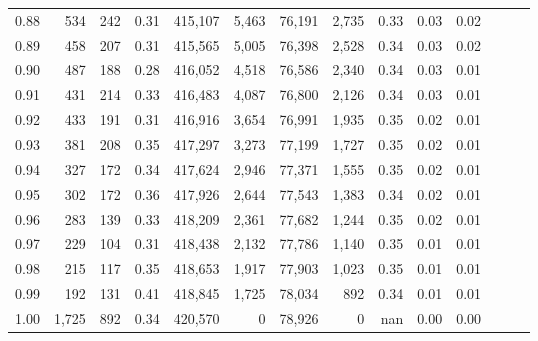 \begin{tabular}{rrrrrrrrrrrrrr}
0.88 &     534 &    242 &  0.31 &  415,107 &    5,463 &  76,191 &   2,735 &  0.33 &  0.03 &      0.02 \\
0.89 &     458 &    207 &  0.31 &  415,565 &    5,005 &  76,398 &   2,528 &  0.34 &  0.03 &      0.02 \\
0.90 &     487 &    188 &  0.28 &  416,052 &    4,518 &  76,586 &   2,340 &  0.34 &  0.03 &      0.01 \\
0.91 &     431 &    214 &  0.33 &  416,483 &    4,087 &  76,800 &   2,126 &  0.34 &  0.03 &      0.01 \\
0.92 &     433 &    191 &  0.31 &  416,916 &    3,654 &  76,991 &   1,935 &  0.35 &  0.02 &      0.01 \\
0.93 &     381 &    208 &  0.35 &  417,297 &    3,273 &  77,199 &   1,727 &  0.35 &  0.02 &      0.01 \\
0.94 &     327 &    172 &  0.34 &  417,624 &    2,946 &  77,371 &   1,555 &  0.35 &  0.02 &      0.01 \\
0.95 &     302 &    172 &  0.36 &  417,926 &    2,644 &  77,543 &   1,383 &  0.34 &  0.02 &      0.01 \\
0.96 &     283 &    139 &  0.33 &  418,209 &    2,361 &  77,682 &   1,244 &  0.35 &  0.02 &      0.01 \\
0.97 &     229 &    104 &  0.31 &  418,438 &    2,132 &  77,786 &   1,140 &  0.35 &  0.01 &      0.01 \\
0.98 &     215 &    117 &  0.35 &  418,653 &    1,917 &  77,903 &   1,023 &  0.35 &  0.01 &      0.01 \\
0.99 &     192 &    131 &  0.41 &  418,845 &    1,725 &  78,034 &     892 &  0.34 &  0.01 &      0.01 \\
1.00 &   1,725 &    892 &  0.34 &  420,570 &        0 &  78,926 &       0 &   nan &  0.00 &      0.00 \\
\bottomrule
\end{tabular}
